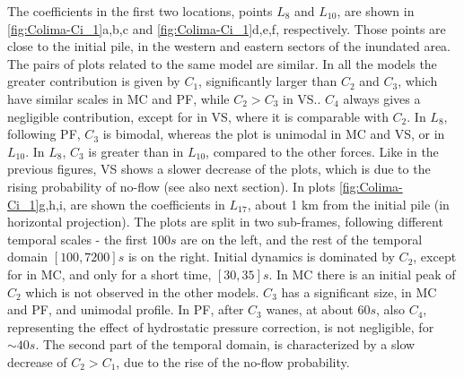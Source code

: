 \documentclass{article}
\begin{document}
The coefficients in the first two locations, points $L_8$ and $L_{10}$, are shown in \ref{fig:Colima-Ci_1}a,b,c and \ref{fig:Colima-Ci_1}d,e,f, respectively. Those points are close to the initial pile, in the western and eastern sectors of the inundated area. The pairs of plots related to the same model are similar. In all the models the greater contribution is given by $C_1$, significantly larger than $C_2$ and $C_3$, which have similar scales in MC and PF, while $C_2>C_3$ in VS.. $C_4$ always gives a negligible contribution, except for in VS, where it is comparable with $C_2$. In $L_8$, following PF, $C_3$ is bimodal, whereas the plot is unimodal in MC and VS, or in $L_{10}$. In $L_8$, $C_3$ is greater than in $L_{10}$, compared to the other forces. Like in the previous figures, VS shows a slower decrease of the plots, which is due to the rising probability of no-flow (see also next section). In plots \ref{fig:Colima-Ci_1}g,h,i, are shown the coefficients in $L_{17}$, about 1 km from the initial pile (in horizontal projection). The plots are split in two sub-frames, following different temporal scales - the first $100 s$ are on the left, and the rest of the temporal domain $[100, 7200] s$ is on the right. Initial dynamics is dominated by $C_2$, except for in MC, and only for a short time, $[30, 35] s$. In MC there is an initial peak of $C_2$ which is not observed in the other models.  $C_3$ has a significant size, in MC and PF, and unimodal profile. In PF, after $C_3$ wanes, at about $60 s$, also $C_4$, representing the effect of hydrostatic pressure correction, is not negligible, for $\sim 40 s$. The second part of the temporal domain, is characterized by a slow decrease of $C_2>C_1$, due to the rise of the no-flow probability.

\newpage


\end{document}

